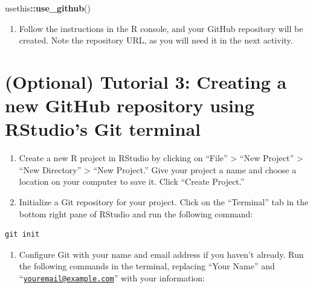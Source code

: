 \documentclass[
]{book}
\newenvironment{Shaded}{\begin{snugshade}}{\end{snugshade}}
\newcommand{\FunctionTok}[1]{\textcolor[rgb]{0.13,0.29,0.53}{\textbf{#1}}}
\newcommand{\NormalTok}[1]{#1}
\newcommand{\SpecialCharTok}[1]{\textcolor[rgb]{0.81,0.36,0.00}{\textbf{#1}}}
\providecommand{\tightlist}{%
  \setlength{\itemsep}{0pt}\setlength{\parskip}{0pt}}
\begin{document}
\begin{Shaded}
\begin{Highlighting}[]
\NormalTok{usethis}\SpecialCharTok{::}\FunctionTok{use\_github}\NormalTok{()}
\end{Highlighting}
\end{Shaded}

\begin{enumerate}
\def\labelenumi{\arabic{enumi}.}
\setcounter{enumi}{8}
\tightlist
\item
  Follow the instructions in the R console, and your GitHub repository will be created. Note the repository URL, as you will need it in the next activity.
\end{enumerate}

\hypertarget{optional-tutorial-3-creating-a-new-github-repository-using-rstudios-git-terminal}{%
\section{(Optional) Tutorial 3: Creating a new GitHub repository using RStudio's Git terminal}\label{optional-tutorial-3-creating-a-new-github-repository-using-rstudios-git-terminal}}

\begin{enumerate}
\def\labelenumi{\arabic{enumi}.}
\item
  Create a new R project in RStudio by clicking on ``File'' \textgreater{} ``New Project'' \textgreater{} ``New Directory'' \textgreater{} ``New Project.'' Give your project a name and choose a location on your computer to save it. Click ``Create Project.''
\item
  Initialize a Git repository for your project. Click on the ``Terminal'' tab in the bottom right pane of RStudio and run the following command:
\end{enumerate}

\begin{verbatim}
git init
\end{verbatim}

\begin{enumerate}
\def\labelenumi{\arabic{enumi}.}
\setcounter{enumi}{2}
\tightlist
\item
  Configure Git with your name and email address if you haven't already. Run the following commands in the terminal, replacing ``Your Name'' and ``\href{mailto:youremail@example.com}{\nolinkurl{youremail@example.com}}'' with your information:
\end{enumerate}
\end{document}
